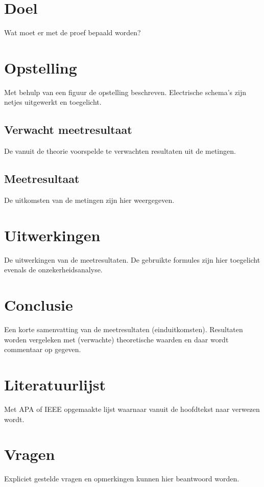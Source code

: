 \documentclass[10pt]{TISmeetrapport}
\begin{document}
\makecoverpage
\section{Doel}
Wat moet er met de proef bepaald worden?

\section{Opstelling}
Met behulp van een figuur de opstelling beschreven. Electrische schema's zijn netjes uitgewerkt en toegelicht. 
\subsection{Verwacht meetresultaat}
De vanuit de theorie voorspelde te verwachten resultaten uit de metingen.
\subsection{Meetresultaat}
De uitkomsten van de metingen zijn hier weergegeven. 

\section{Uitwerkingen}
De uitwerkingen van de meetresultaten. De gebruikte formules zijn hier toegelicht evenals de onzekerheidsanalyse.

\section{Conclusie}
Een korte samenvatting van de meetresultaten (einduitkomsten). Resultaten worden vergeleken met (verwachte) theoretische waarden en daar wordt commentaar op gegeven. 

\section{Literatuurlijst}
Met APA of IEEE opgemaakte lijst waarnaar vanuit de hoofdtekst naar verwezen wordt. 

\appendix
\section{Vragen}
Expliciet gestelde vragen en opmerkingen kunnen hier beantwoord worden. 
\end{document}
